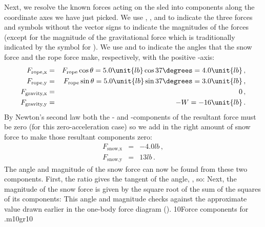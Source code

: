 {Next, we resolve the known forces acting on the sled into components
along the coordinate axes we have just picked.
We use , , and  to
indicate the three forces and symbols without the vector signs to
indicate the magnitudes of the forces (except for the magnitude of the
gravitational force which is traditionally indicated by the symbol
 for ).
We use \m{\theta} and \m{\phi} to indicate the angles that the snow force
and the rope force make, respectively, with the positive -axis:
%
\begin{eqnarray*}
%
F_\text{rope,x} & = & F_\text{rope} \cos{\theta} = 5.0\unit{lb} \cos{37\degrees} = 4.0\unit{lb}\,,\\
%
F_\text{rope,y} & = & F_\text{rope} \sin{\theta} = 5.0\unit{lb} \sin{37\degrees} = 3.0\unit{lb}\,,\\
%
F_\text{gravity,x} & = & 0 \,,\\
%
F_\text{gravity,y} & = & -W = -16\unit{lb}\,.
%
\end{eqnarray*}
%
By Newton's second law both the - and -components of the
resultant force must be zero (for this zero-acceleration case) so we
add in the right amount of snow force to make those resultant components zero:
%
\begin{eqnarray*}
%
F_\text{snow,x} & = & -4.0\unit{lb}\,,\\
%
F_\text{snow,y} & = & 13\unit{lb}\,.
%
\end{eqnarray*}
%
The angle and magnitude of the snow force can now be found from
these two components.
First, the ratio  gives the tangent of the angle, \m{\tan{\phi}},
so:
%
\newsavebox{\hlp}
%
Next, the magnitude of the snow force is given by the square root
of the sum of the squares of its components:
%
%
This angle and magnitude checks against the approximate value drawn
earlier in the one-body force diagram ().
%
                          {10}{Force components for .}{m10gr10}

}
